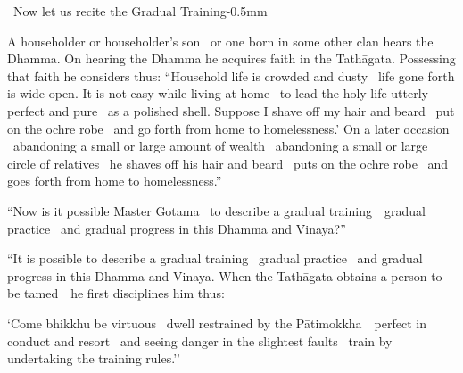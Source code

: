 \vspace{-0.2cm}

\else

\begin{leader-english}
  \anglebracketleft\ \hspace{-0.5mm}Now let us recite the Gradual Training{-0.5mm}\anglebracketright\
\end{leader-english}

\fi

\begin{english-only-justify}
  A householder or householder's son \breathmark\ or one born in some other clan hears the Dhamma. On hearing the Dhamma he acquires faith in the Tathāgata. Possessing that faith he considers thus: ``Household life is crowded and dusty \breathmark\ life gone forth is wide open. It is not easy while living at home \breathmark\ to lead the holy life utterly perfect and pure \breathmark\ as a polished shell. Suppose I shave off my hair and beard \breathmark\ put on the ochre robe \breathmark\ and go forth from home to homelessness.' On a later occasion \breathmark\ abandoning a small or large amount of wealth \breathmark\ abandoning a small or large circle of relatives \breathmark\ he shaves off his hair and beard \breathmark\ puts on the ochre robe \breathmark\ and goes forth from home to homelessness.''
\end{english-only-justify}

\suttaRef{[MN 27 / 38 / 51]}

\begin{english-only-justify}
  ``Now is it possible Master Gotama \breathmark\ to describe a gradual \mbox{training}~\breathmark\ gradual practice \breathmark\ and gradual progress in this Dhamma and Vinaya?''
\end{english-only-justify}

\ifninebythirteen

\begin{english-only-justify}
  ``It is possible to describe a gradual training \breathmark\ gradual practice \breathmark\ and gradual progress in this Dhamma and Vinaya. When the Tathāgata obtains a person to be \mbox{tamed}~\breathmark\ he first disciplines him thus:
\end{english-only-justify}

\clearpage

\begin{english-only-justify}
  `Come bhikkhu be virtuous \breathmark\ dwell restrained by the \mbox{Pātimokkha}~\breathmark\ perfect in conduct and resort \breathmark\ and seeing danger in the slightest faults \breathmark\ train by undertaking the training rules.''
\end{english-only-justify}

